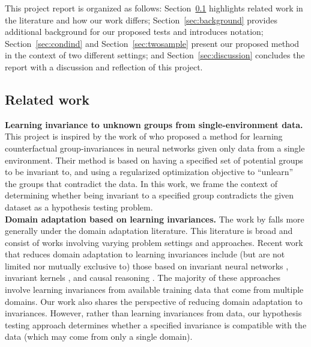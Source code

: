 This project report is organized as follows: Section~\ref{sec:related} highlights related work in the literature and how our work differs; Section~\ref{sec:background} provides additional background for our proposed tests and introduces notation; Section~\ref{sec:condind} and Section~\ref{sec:twosample} present our proposed method in the context of two different settings; and Section~\ref{sec:discussion} concludes the report with a discussion and reflection of this project.


\subsection{Related work}\label{sec:related}

\textbf{Learning invariance to unknown groups from single-environment data.} This project is inspired by the work of \textcite{Mouli:2021} who proposed a method for learning counterfactual group-invariances in neural networks given only data from a single environment. Their method is based on having a specified set of potential groups to be invariant to, and using a regularized optimization objective to ``unlearn'' the groups that contradict the data. In this work, we frame the context of determining whether being invariant to a specified group contradicts the given dataset as a hypothesis testing problem.
\\

\textbf{Domain adaptation based on learning invariances.} The work by \textcite{Mouli:2021} falls more generally under the domain adaptation literature. This literature is broad and consist of works involving varying problem settings and approaches. Recent work that reduces domain adaptation to learning invariances include (but are not limited nor mutually exclusive to) those based on invariant neural networks \parencite{Li:2018,Zhao:2019,Schwobel:2021}, invariant kernels \parencite{Li:2018,Ma:2019,Elesedy:2021:equivariant,Elesedy:2021}, and causal reasoning \parencite{Magliacane:2017,Chen:2020:scm}. The majority of these approaches involve learning invariances from available training data that come from multiple domains. Our work also shares the perspective of reducing domain adaptation to invariances. However, rather than learning invariances from data, our hypothesis testing approach determines whether a specified invariance is compatible with the data (which may come from only a single domain).
\\

